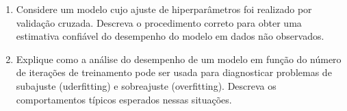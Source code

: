 \documentclass[9pt,a4paper]{extarticle}
\begin{document}
\begin{enumerate}[label=\textbf{\arabic*)}, itemsep=1.3em]
\item Considere um modelo cujo ajuste de hiperparâmetros foi realizado por validação cruzada. Descreva o procedimento correto para obter uma estimativa confiável do desempenho do modelo em dados não observados.

\item Explique como a análise do desempenho de um modelo em função do número de iterações de treinamento pode ser usada para diagnosticar problemas de subajuste (uderfitting) e sobreajuste (overfitting). Descreva os comportamentos típicos esperados nessas situações.

 


\end{enumerate}
\end{document}
